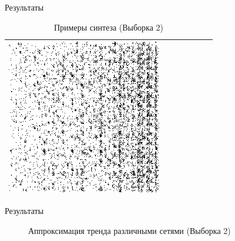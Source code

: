 \documentclass[12pt]{beamer}
\begin{document}
\begin{frame}{Результаты}
\begin{table}
\begin{center}
\begin{tabular}{p{1.2cm} p{1.2cm} p{1.2cm} p{1.2cm} p{1.2cm} p{1.2cm} p{1.2cm}}
					\includegraphics[width=1\linewidth]{8-results/sand-trend8/nf64e10/gen3}
					\\
					\hline
				\end{tabular}
				\caption{Примеры синтеза (Выборка 2)}
			\end{center}
		\end{table}
	\end{frame}
	
	\begin{frame}{Результаты}
			\begin{figure}
				\caption{Аппроксимация тренда различными сетями (Выборка 2)}
			\end{figure}
	\end{frame}
	
\end{document}
